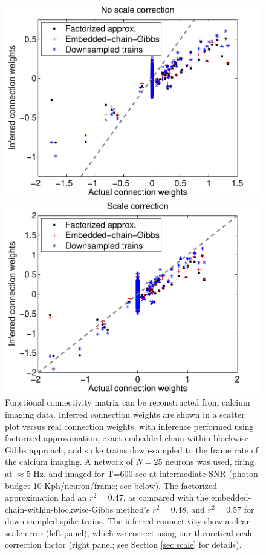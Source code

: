 \begin{figure}[h]
\centering
\begin{minipage}[c]{0.45\hsize}
\includegraphics[width=\hsize]{../figs/FigureA3_scatter_three}
\end{minipage}
\begin{minipage}[c]{0.45\hsize}
\includegraphics[width=\hsize]{../figs/FigureA3_scatter_three_corrected}
\end{minipage}
\caption{Functional connectivity matrix can be reconstructed from calcium imaging data.
Inferred connection weights are shown in a scatter plot versus real connection weights, with inference performed using factorized approximation, exact embedded-chain-within-blockwise-Gibbs approach, and spike trains down-sampled to the frame rate of the calcium imaging. A network of $N=25$ neurons was used, firing at $\approx 5$ Hz, and imaged for T=600 sec at intermediate SNR (photon budget 10 Kph/neuron/frame; see below). The factorized approximation had an $r^2=0.47$, as compared with the embedded-chain-within-blockwise-Gibbs method's $r^2=0.48$, and $r^2=0.57$ for down-sampled spike trains. The inferred connectivity show a clear scale error (left panel), which we correct using our theoretical scale correction factor (right panel; see Section \ref{sec:scale} for details).} \label{fig:scatters} \end{figure}

